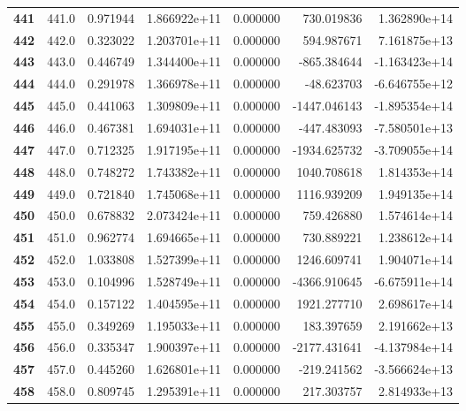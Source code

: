 \documentclass{report}[12pt]
\begin{document}
\begin{center}
\begin{tabular}{lrrrrrr}
\textbf{441 } &          441.0 &   0.971944 &  1.866922e+11 &    0.000000 &   730.019836 &  1.362890e+14 \\
\textbf{442 } &          442.0 &   0.323022 &  1.203701e+11 &    0.000000 &   594.987671 &  7.161875e+13 \\
\textbf{443 } &          443.0 &   0.446749 &  1.344400e+11 &    0.000000 &  -865.384644 & -1.163423e+14 \\
\textbf{444 } &          444.0 &   0.291978 &  1.366978e+11 &    0.000000 &   -48.623703 & -6.646755e+12 \\
\textbf{445 } &          445.0 &   0.441063 &  1.309809e+11 &    0.000000 & -1447.046143 & -1.895354e+14 \\
\textbf{446 } &          446.0 &   0.467381 &  1.694031e+11 &    0.000000 &  -447.483093 & -7.580501e+13 \\
\textbf{447 } &          447.0 &   0.712325 &  1.917195e+11 &    0.000000 & -1934.625732 & -3.709055e+14 \\
\textbf{448 } &          448.0 &   0.748272 &  1.743382e+11 &    0.000000 &  1040.708618 &  1.814353e+14 \\
\textbf{449 } &          449.0 &   0.721840 &  1.745068e+11 &    0.000000 &  1116.939209 &  1.949135e+14 \\
\textbf{450 } &          450.0 &   0.678832 &  2.073424e+11 &    0.000000 &   759.426880 &  1.574614e+14 \\
\textbf{451 } &          451.0 &   0.962774 &  1.694665e+11 &    0.000000 &   730.889221 &  1.238612e+14 \\
\textbf{452 } &          452.0 &   1.033808 &  1.527399e+11 &    0.000000 &  1246.609741 &  1.904071e+14 \\
\textbf{453 } &          453.0 &   0.104996 &  1.528749e+11 &    0.000000 & -4366.910645 & -6.675911e+14 \\
\textbf{454 } &          454.0 &   0.157122 &  1.404595e+11 &    0.000000 &  1921.277710 &  2.698617e+14 \\
\textbf{455 } &          455.0 &   0.349269 &  1.195033e+11 &    0.000000 &   183.397659 &  2.191662e+13 \\
\textbf{456 } &          456.0 &   0.335347 &  1.900397e+11 &    0.000000 & -2177.431641 & -4.137984e+14 \\
\textbf{457 } &          457.0 &   0.445260 &  1.626801e+11 &    0.000000 &  -219.241562 & -3.566624e+13 \\
\textbf{458 } &          458.0 &   0.809745 &  1.295391e+11 &    0.000000 &   217.303757 &  2.814933e+13 \\

\end{tabular}
\end{center}
\end{document}
